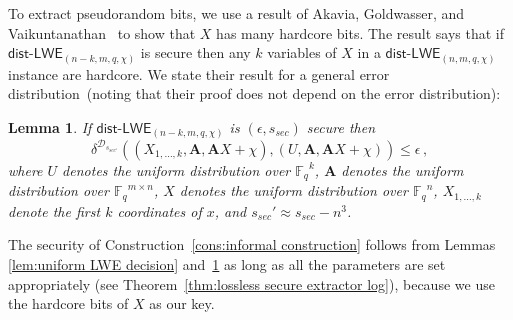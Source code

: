 \documentclass[11pt]{article}
\newcommand{\thref}[1]{\mbox{Theorem~\ref{#1}}}
\newcommand{\lemref}[1]{\mbox{Lemma~\ref{#1}}}
\newcommand{\consref}[1]{\mbox{Construction~\ref{#1}}}
\newcommand{\class}[1]{{\ensuremath{\mathsf{#1}}}}
\newcommand{\vect}[1]{\ensuremath{\textbf{#1}}}
\newcommand{\Fq}{\ensuremath{\mathbb{F}_q}}
\newcommand{\unp}{\ensuremath{\mathtt{unp}}\xspace}
\newcommand{\poly}{\ensuremath{\mathtt{poly}}\xspace}
\newcommand{\ngl}{\ensuremath{\mathtt{ngl}}\xspace}
\newcommand{\distLWE}{\ensuremath{\class{dist\mbox{-}LWE}}}
\newtheorem{lemma}[theorem]{Lemma}
\newcommand{\vA}{\vect{A}}
\begin{document}
To extract pseudorandom bits, we use a result of Akavia, Goldwasser, and Vaikuntanathan~\cite{akavia2009} to show that $X$ has many hardcore bits.  The result says that if $\distLWE_{(n-k, m, q, \chi)}$ is secure then any $k$ variables of $X$ in a $\distLWE_{(n, m, q, \chi)}$ instance are hardcore.  We state their result for a general error distribution~(noting that their proof does not depend on the error distribution):
\begin{lemma}
\label{lem:many hardcore bits}
 If $\distLWE_{(n-k, m, q, \chi)}$ is $(\epsilon, s_{sec})$ secure then
\[\delta^ {\mathcal{D}_{s_{sec'}}} ((X_{1,\dots, k}, \vA, \vA X+\chi) , (U, \vA, \vA X+\chi)) \le \epsilon\,,\]
where $U$ denotes the uniform distribution over $\Fq^k$,  $\vA$ denotes the uniform distribution over $\Fq^{m\times n}$, $X$ denotes the uniform distribution over $\Fq^n$, $X_{1,\dots, k}$ denote the first $k$ coordinates of $x$, and $s_{sec}' \approx s_{sec} - n^3$.
\end{lemma}



The security of  \consref{cons:informal construction} follows from Lemmas \ref{lem:uniform LWE decision} and~\ref{lem:many hardcore bits} as long as all the parameters are set appropriately (see \thref{thm:lossless secure extractor log}),  because we use the hardcore bits of $X$ as our key.  
\end{document}
